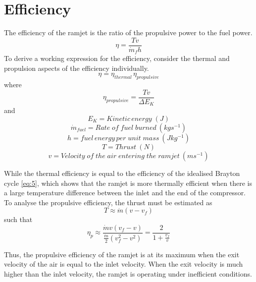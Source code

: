 \documentclass[12pt,onecolumn]{IEEEtran}
\begin{document}
\section{Efficiency}
\begin{flushleft}
The efficiency of the ramjet is the ratio of the propulsive power to the fuel power.\cite{greitzer_spakovsky_waitz}\\
\begin{equation}
 \eta = \frac{Tv}{\dot{m}_f h}
\end{equation}
To derive a working expression for the efficiency, consider the thermal and propulsion aspects of the efficiency individually.\\
\begin{equation}
\eta = \eta_{thermal}\,\eta_{propulsive}
\end{equation}
where\\
\begin{equation}
\eta_{propulsive}=\frac{Tv}{\Delta E_K}
\end{equation}
and
\[E_K =  Kinetic\,energy\;(J)\]
\[\dot{m}_{fuel} =  Rate\;of\;fuel\;burned\:(kgs^{-1})\]
\[h = fuel\,energy\,per\;unit\;mass\:(Jkg^{-1})\]
\[T =  Thrust\:(N)\]
\[v =  Velocity\;of\;the\;air\;entering\;the\;ramjet\:(ms^{-1})\]


While the thermal efficiency is equal to the efficiency of the idealised Brayton cycle \eqref{eq:5}, which shows that the ramjet is more thermally efficient when there is a large temperature difference between the inlet and the end of the compressor.\\
To analyse the propulsive efficiency, the thrust must be estimated as\\
\begin{equation}
T\approx\dot{m}(v-v_f)
\end{equation}
\vspace{1mm}
such that\\
\begin{equation}
\eta_p\approx\frac{\dot{m}v(v_f-v)}{\frac{\dot{m}}{2}(v_f^2-v^2)}=\frac{2}{1+\frac{v_f}{v}}
\end{equation}

Thus, the propulsive efficiency of the ramjet is at its maximum when the exit velocity of the air is equal to the inlet velocity. When the exit velocity is much higher than the inlet velocity, the ramjet is operating under inefficient conditions.
\end{flushleft}


\end{document}
